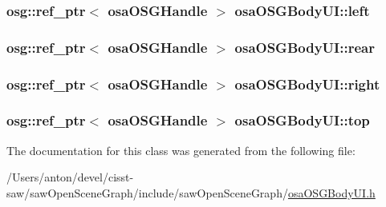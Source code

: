 \subsubsection[{left}]{\setlength{\rightskip}{0pt plus 5cm}osg\+::ref\+\_\+ptr$<$ {\bf osa\+O\+S\+G\+Handle} $>$ osa\+O\+S\+G\+Body\+U\+I\+::left\hspace{0.3cm}{\ttfamily [protected]}}\label{classosa_o_s_g_body_u_i_a850b2ab2b5a8bd278ad22c00a6313502}
\hypertarget{classosa_o_s_g_body_u_i_aa32fb4a77a38fdefe326191750129319}{}
\subsubsection[{rear}]{\setlength{\rightskip}{0pt plus 5cm}osg\+::ref\+\_\+ptr$<$ {\bf osa\+O\+S\+G\+Handle} $>$ osa\+O\+S\+G\+Body\+U\+I\+::rear\hspace{0.3cm}{\ttfamily [protected]}}\label{classosa_o_s_g_body_u_i_aa32fb4a77a38fdefe326191750129319}
\hypertarget{classosa_o_s_g_body_u_i_a7cda4d7ffa7040ba452edd7e31ebf6f5}{}
\subsubsection[{right}]{\setlength{\rightskip}{0pt plus 5cm}osg\+::ref\+\_\+ptr$<$ {\bf osa\+O\+S\+G\+Handle} $>$ osa\+O\+S\+G\+Body\+U\+I\+::right\hspace{0.3cm}{\ttfamily [protected]}}\label{classosa_o_s_g_body_u_i_a7cda4d7ffa7040ba452edd7e31ebf6f5}
\hypertarget{classosa_o_s_g_body_u_i_a5737e52da9fa403eee45b672873e51c1}{}
\subsubsection[{top}]{\setlength{\rightskip}{0pt plus 5cm}osg\+::ref\+\_\+ptr$<$ {\bf osa\+O\+S\+G\+Handle} $>$ osa\+O\+S\+G\+Body\+U\+I\+::top\hspace{0.3cm}{\ttfamily [protected]}}\label{classosa_o_s_g_body_u_i_a5737e52da9fa403eee45b672873e51c1}


The documentation for this class was generated from the following file\+:\begin{DoxyCompactItemize}
\item 
/\+Users/anton/devel/cisst-\/saw/saw\+Open\+Scene\+Graph/include/saw\+Open\+Scene\+Graph/\hyperlink{osa_o_s_g_body_u_i_8h}{osa\+O\+S\+G\+Body\+U\+I.\+h}\end{DoxyCompactItemize}

